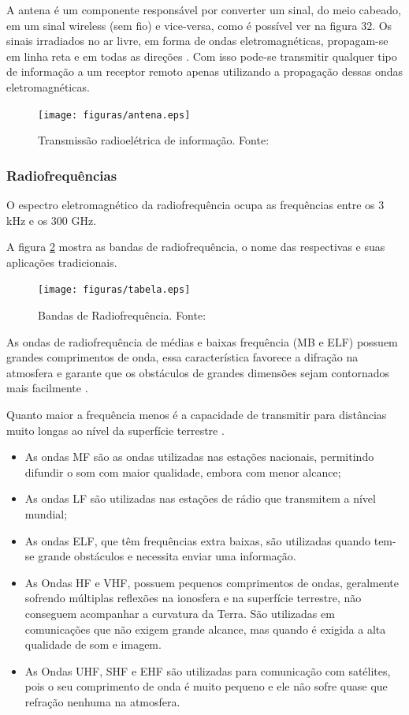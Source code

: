 A antena é um componente responsável por converter um sinal, do meio cabeado, em um sinal wireless (sem fio) e vice-versa, como é possível ver na figura 32. Os sinais irradiados no ar livre, em forma de ondas eletromagnéticas, propagam-se em linha reta e em todas as direções \cite{Rappaport2}. Com isso pode-se transmitir qualquer tipo de informação a um receptor remoto apenas utilizando a propagação dessas ondas eletromagnéticas.

\begin{figure}[H]
	\centering
	  \texttt{[image: figuras/antena.eps]}
	\caption{Transmissão radioelétrica de informação. Fonte: \cite{antena}}
	\label{fig:antena}
\end{figure}

\subsubsection{Radiofrequências}

O espectro eletromagnético da radiofrequência ocupa as frequências entre os 3 kHz e os 300 GHz. 

A figura \ref{fig:tabelafre} mostra as bandas de radiofrequência, o nome das respectivas e suas aplicações tradicionais.

\begin{figure}[H]
	\centering
	  \texttt{[image: figuras/tabela.eps]}
	\caption{Bandas de Radiofrequência. Fonte: \cite{tabela}}
	\label{fig:tabelafre}
\end{figure}

As ondas de radiofrequência de médias e baixas frequência (MB e ELF) possuem grandes comprimentos de onda, essa característica favorece a difração na atmosfera e garante que os obstáculos de grandes dimensões sejam contornados mais facilmente \cite{Rappaport2}.

Quanto maior a frequência menos é a capacidade de transmitir para distâncias muito longas ao nível da superfície terrestre \cite{VALLE1}. 

\begin{itemize}
	\item As ondas MF são as ondas utilizadas nas estações nacionais, permitindo difundir o som com maior qualidade, embora com menor alcance;
	\item As ondas LF são utilizadas nas estações de rádio que transmitem a nível mundial;
	\item As ondas ELF, que têm frequências extra baixas, são utilizadas quando tem-se grande obstáculos e necessita enviar uma informação. 
	\item As Ondas HF e VHF, possuem pequenos comprimentos de ondas, geralmente sofrendo múltiplas reflexões na ionosfera e na superfície terrestre, não conseguem acompanhar a curvatura da Terra. São utilizadas em comunicações que não exigem grande alcance, mas quando é exigida a alta qualidade de som e imagem.
	\item As Ondas UHF, SHF e EHF são utilizadas para comunicação com satélites, pois o seu comprimento de onda é muito pequeno e ele não sofre quase que refração nenhuma na atmosfera. 
\end{itemize} 

